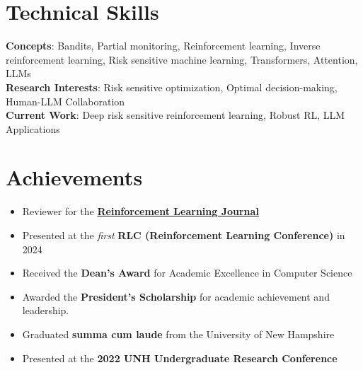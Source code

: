 \documentclass[letterpaper,11pt]{article}
\begin{document}
\section{Technical Skills}
    \begin{itemize}[leftmargin=0.15in, label={}]
	\small{\item{
		\textbf{Concepts}{: Bandits, Partial monitoring, Reinforcement learning, Inverse reinforcement learning, Risk sensitive machine learning, Transformers, Attention, LLMs} \\
		\textbf{Research Interests}{: Risk sensitive optimization, Optimal decision-making, Human-LLM Collaboration} \\
                \textbf{Current Work}{: Deep risk sensitive reinforcement learning, Robust RL, LLM Applications} \\
	}}
    \end{itemize}
\section{Achievements}
\begin{itemize} %
    \item Reviewer for the \href{https://rlj.cs.umass.edu/}{\textbf{Reinforcement Learning Journal}}
    \item Presented at the \emph{first} \textbf{RLC (Reinforcement Learning Conference)} in 2024
    \item Received the \textbf{Dean's Award} for Academic Excellence in Computer Science
    \item Awarded the \textbf{President's Scholarship} for academic achievement and leadership.
    \item Graduated \textbf{summa cum laude} from the University of New Hampshire
    \item Presented at the \textbf{2022 UNH Undergraduate Research Conference}
\end{itemize} %
\end{document}
